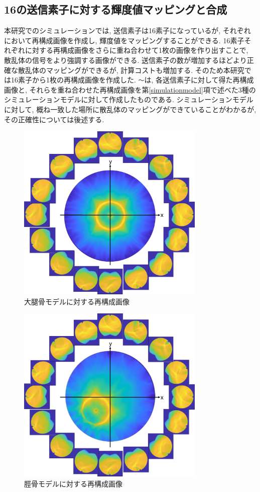 \subsection{16の送信素子に対する輝度値マッピングと合成}
本研究でのシミュレーションでは, 送信素子は16素子になっているが, それぞれにおいて再構成画像を作成し, 輝度値をマッピングすることができる. 16素子それぞれに対する再構成画像をさらに重ね合わせて1枚の画像を作り出すことで, 散乱体の信号をより強調する画像ができる. 送信素子の数が増加するほどより正確な散乱体のマッピングができるが, 計算コストも増加する. そのため本研究では16素子から1枚の再構成画像を作成した. \verb|〜|は, 各送信素子に対して得た再構成画像と, それらを重ね合わせた再構成画像を第\ref{simulationmodel}項で述べた3種のシミュレーションモデルに対して作成したものである. シミュレーションモデルに対して, 概ね一致した場所に散乱体のマッピングができていることがわかるが, その正確性については後述する. 
\begin{figure}[H]
  \begin{center}
    \includegraphics[width=90mm]{fig/daitai16.pdf}
  \end{center}
  \caption{大腿骨モデルに対する再構成画像}
\end{figure}
\begin{figure}[H]
  \begin{center}
    \includegraphics[width=90mm]{fig/keikotsu16.pdf}
  \end{center}
  \caption{脛骨モデルに対する再構成画像}
\end{figure}

